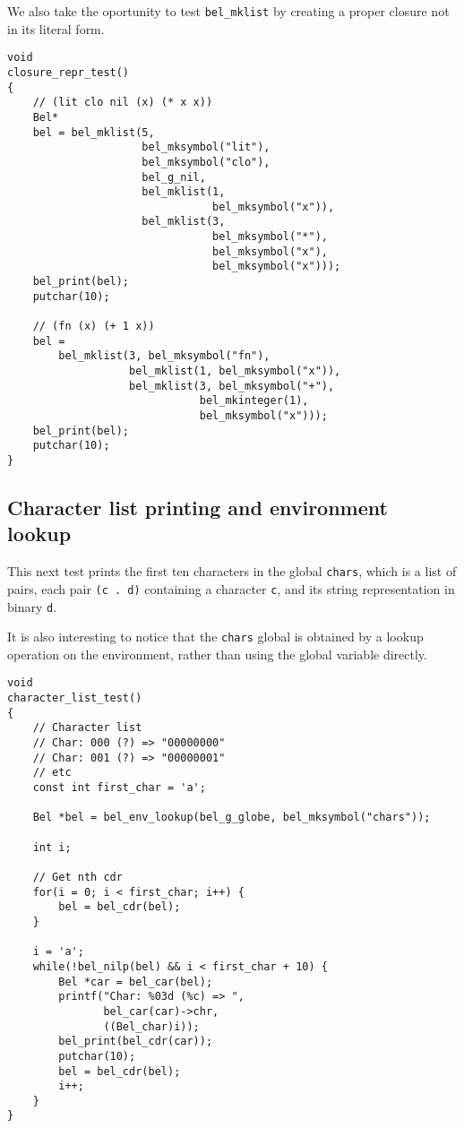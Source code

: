 \documentclass[openright,a4paper,twoside,12pt]{memoir}
\begin{document}
We also take the oportunity to test \texttt{bel\_mklist} by creating a proper
closure not in its literal form.

\begin{verbatim}
void
closure_repr_test()
{
    // (lit clo nil (x) (* x x))
    Bel*
    bel = bel_mklist(5,
                     bel_mksymbol("lit"),
                     bel_mksymbol("clo"),
                     bel_g_nil,
                     bel_mklist(1,
                                bel_mksymbol("x")),
                     bel_mklist(3,
                                bel_mksymbol("*"),
                                bel_mksymbol("x"),
                                bel_mksymbol("x")));
    bel_print(bel);
    putchar(10);

    // (fn (x) (+ 1 x))
    bel =
        bel_mklist(3, bel_mksymbol("fn"),
                   bel_mklist(1, bel_mksymbol("x")),
                   bel_mklist(3, bel_mksymbol("+"),
                              bel_mkinteger(1),
                              bel_mksymbol("x")));
    bel_print(bel);
    putchar(10);     
}
\end{verbatim}

\subsection{Character list printing and environment lookup}
\label{sec:org2256170}

This next test prints the first ten characters in the global \texttt{chars},
which is a list of pairs, each pair \texttt{(c . d)} containing a character \texttt{c},
and its string representation in binary \texttt{d}.

It is also interesting to notice that the \texttt{chars} global is obtained by
a lookup operation on the environment, rather than using the global
variable directly.

\begin{verbatim}
void
character_list_test()
{
    // Character list
    // Char: 000 (?) => "00000000"
    // Char: 001 (?) => "00000001"
    // etc
    const int first_char = 'a';
    
    Bel *bel = bel_env_lookup(bel_g_globe, bel_mksymbol("chars"));
    
    int i;

    // Get nth cdr
    for(i = 0; i < first_char; i++) {
        bel = bel_cdr(bel);
    }

    i = 'a';
    while(!bel_nilp(bel) && i < first_char + 10) {
        Bel *car = bel_car(bel);
        printf("Char: %03d (%c) => ",
               bel_car(car)->chr,
               ((Bel_char)i));
        bel_print(bel_cdr(car));
        putchar(10);
        bel = bel_cdr(bel);
        i++;
    }
}
\end{verbatim}
\end{document}
